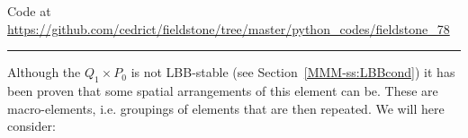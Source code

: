 %

\begin{center}
Code at \url{https://github.com/cedrict/fieldstone/tree/master/python_codes/fieldstone_78}
\end{center}

\par\noindent\rule{\textwidth}{0.4pt}



Although the $Q_1\times P_0$ is not LBB-stable (see Section~\ref{MMM-ss:LBBcond})
it has been proven that some spatial arrangements of this element can be.
These are macro-elements, i.e. groupings of elements that are then repeated.
We will here consider:

